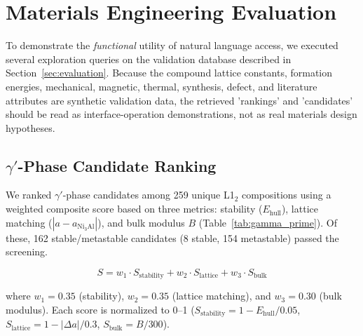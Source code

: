 \documentclass{npj-compt.mater}
\begin{document}
\section{Materials Engineering Evaluation}
\label{sec:materials_evaluation}

To demonstrate the \emph{functional} utility of natural language
access, we executed several exploration queries on the validation
database described in Section~\ref{sec:evaluation}.  Because the
compound lattice constants, formation energies, mechanical,
magnetic, thermal, synthesis, defect, and literature attributes are
synthetic validation data, the retrieved 'rankings' and
'candidates' should be read as interface-operation demonstrations,
not as real materials design hypotheses.

\subsection{$\gamma'$-Phase Candidate Ranking}
\label{sec:gamma_prime}

We ranked $\gamma'$-phase candidates among 259 unique L1$_2$
compositions using a weighted composite score based on three
metrics: stability ($E_\text{hull}$), lattice matching
($|a - a_{\text{Ni}_3\text{Al}}|$), and bulk modulus $B$
(Table~\ref{tab:gamma_prime}).
Of these, 162 stable/metastable candidates (8 stable, 154
metastable) passed the screening.

\begin{equation}
  S = w_1 \cdot S_\text{stability} + w_2 \cdot S_\text{lattice} + w_3 \cdot S_\text{bulk}
  \label{eq:composite_score}
\end{equation}

where $w_1 = 0.35$ (stability), $w_2 = 0.35$ (lattice matching),
and $w_3 = 0.30$ (bulk modulus).
Each score is normalized to 0--1
($S_\text{stability} = 1 - E_\text{hull}/0.05$,
$S_\text{lattice} = 1 - |\Delta a|/0.3$,
$S_\text{bulk} = B/300$).
\end{document}
